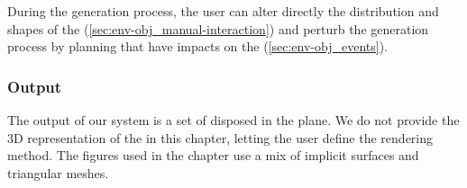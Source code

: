 During the generation process, the user can alter directly the distribution and shapes of the  (\cref{sec:env-obj_manual-interaction}) and perturb the generation process by planning  that have impacts on the  (\cref{sec:env-obj_events}).


\subsubsection{Output}
The output of our system is a set of  disposed in the plane. We do not provide the 3D representation of the  in this chapter, letting the user define the rendering method. The figures used in the chapter use a mix of implicit surfaces and triangular meshes.

\subsection{ }
\label{sec:env-obj_environmental-objects}

